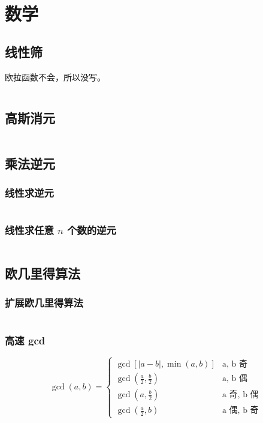 \section{数学}

\subsection{线性筛}

欧拉函数不会，所以没写。

\inputminted{cpp}{icpc/math/prime/prime.cpp}

\subsection{高斯消元}

\inputminted{cpp}{icpc/math/gauss/gauss.cpp}

\subsection{乘法逆元}

\subsubsection{线性求逆元}

\inputminted{cpp}{icpc/math/inv/inv.cpp}

\subsubsection{线性求任意 $n$ 个数的逆元}

\inputminted{cpp}{icpc/math/inv/inv_any.cpp}

\subsection{欧几里得算法}

\subsubsection{扩展欧几里得算法}

\inputminted[mathescape]{cpp}{icpc/math/gcd/ex_eculid.cpp}

\subsubsection{高速 gcd}

\[
\gcd\left(a, b\right) = \begin{cases}
\gcd\left[|a - b|, \min(a, b)\right] & \text{a, b 奇} \\
\gcd\left(\frac{a}{2}, \frac{b}{2}\right) & \text{a, b 偶} \\
\gcd\left(a, \frac{b}{2}\right) & \text{a 奇, b 偶} \\
\gcd\left(\frac{a}{2}, b\right) & \text{a 偶, b 奇} 
\end{cases}
\]

